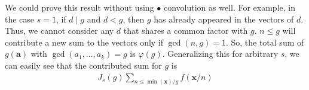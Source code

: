 \documentclass[elemannt.tex]{subfile}
\begin{document}
		\begin{remark}
			We could prove this result without using $\bullet$ convolution as well. For example, in the case $s=1$, if $d\mid g$ and $d<g$, then $g$ has already appeared in the vectors of $d$. Thus, we cannot consider any $d$ that shares a common factor with $g$. $n\leq g$ will contribute a new sum to the vectors only if $\gcd(n,g)=1$. So, the total sum of $g(\mathbf{a})$ with $\gcd(a_{1},\ldots,a_{k})=g$ is $\varphi(g)$. Generalizing this for arbitrary $s$, we can easily see that the contributed sum for $g$ is
				\begin{align*}
					J_{s}(g)\sum_{n\leq\min(\mathbf{x})/g}f(\mathbf{x}/n)
				\end{align*}
		\end{remark}
\end{document}
